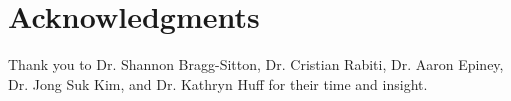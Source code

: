 \documentclass{article}                                                                           %
\begin{document}
\pagebreak
\section*{Acknowledgments}

Thank you to Dr. Shannon Bragg-Sitton, Dr. Cristian Rabiti, Dr. Aaron Epiney, Dr. Jong Suk Kim, and Dr. Kathryn Huff for their time and insight.

\pagebreak


\end{document}
